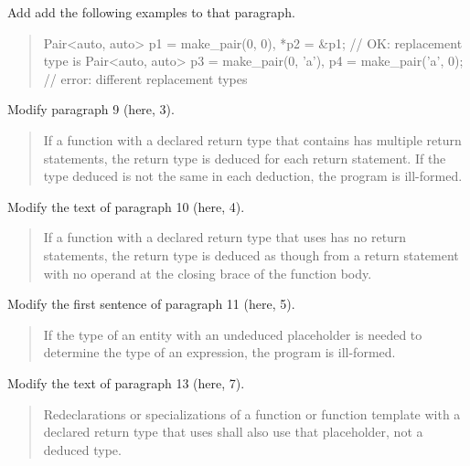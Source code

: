 Add add the following examples to that paragraph.

\begin{quote}
\enterexample
\begin{addedblock}
\begin{codeblock}
Pair<auto, auto> p1 = make_pair(0, 0), 
                 *p2 = &p1;              // OK: replacement type is 
Pair<auto, auto> p3 = make_pair(0, 'a'), 
                 p4 = make_pair('a', 0); // error: different replacement types
\end{codeblock}
\end{addedblock}
\exitexample
\end{quote}

Modify paragraph 9 (here, 3).
\begin{quote}
\pnum
If a function with a declared return type that contains 
has multiple return statements,
the return type is deduced for each return statement. 
If the type deduced is not the same in each deduction,
the program is ill-formed.
\end{quote}

Modify the text of paragraph 10 (here, 4).

\begin{quote}
\pnum
If a function with a declared return type that uses 
has no return statements, the return type is deduced as though from 
a return statement with no operand at the closing brace of the function
body. 
\end{quote}

Modify the first sentence of paragraph 11 (here, 5).

\begin{quote}
\pnum
If the type of an entity with an undeduced placeholder  
is needed to determine the type of an expression, the program is 
ill-formed.
\end{quote}

Modify the text of paragraph 13 (here, 7).

\begin{quote}
\setcounter{Paras}{6}
\pnum
Redeclarations or specializations of a function or function template 
with a declared return type that uses 
 shall also use that placeholder, 
not a deduced type.
% 
\end{quote}

